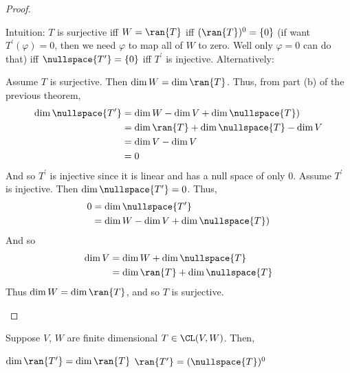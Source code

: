 \documentclass{article}
\begin{document}
  \begin{proof}
    \begin{enumerate}[label=\alph*)]
      \ii 
        Intuition: $T$ is surjective iff $W = \ran{T}$ iff $(\ran{T})^0 = \{0\}$ (if want $T^{\prime}(\varphi) = 0$, then we need $\varphi$ to map all of $W$ to zero. Well only $\varphi = 0$
        can do that) iff $\nullspace{T^{\prime}} = \{0\}$ iff $T^{\prime}$ is injective. Alternatively:

        Assume $T$ is surjective. Then $\dim W = \dim\ran{T}$. Thus, from part (b) of the previous theorem,
        \begin{align*}
          \dim\nullspace{T^{\prime}} & = \dim W - \dim V + \dim\nullspace{T}) \\
          & = \dim\ran{T} + \dim\nullspace{T} - \dim V\\
          & = \dim V - \dim V \\
          & = 0
        \end{align*}
        And so $T^{\prime}$ is injective since it is linear and has a null space of only $0$.
      \ii 
        Assume $T^{\prime}$ is injective. Then $\dim\nullspace{T^{\prime}} = 0$. Thus,
        \begin{align*}
          0 & = \dim\nullspace{T^{\prime}} \\
          & = \dim W - \dim V + \dim\nullspace{T}) \\
        \end{align*}
        And so 
        \begin{align*}
          \dim V & = \dim W + \dim\nullspace{T} \\
          & = \dim\ran{T} + \dim\nullspace{T}
        \end{align*}
        Thus $\dim W = \dim\ran{T}$, and so $T$ is surjective.
    \end{enumerate}
  \end{proof}
  \begin{prop}\label{prop:range_dual_null_annihilator}
    Suppose $V$, $W$ are finite dimensional $T \in \CL(V, W)$. Then,
    \begin{enumerate}[label=\alph*)]
        \ii 
          $\dim\ran{T^{\prime}} = \dim\ran{T}$
        \ii 
          $\ran{T^{\prime}} = (\nullspace{T})^0$
    \end{enumerate}
  \end{prop}
\end{document}
